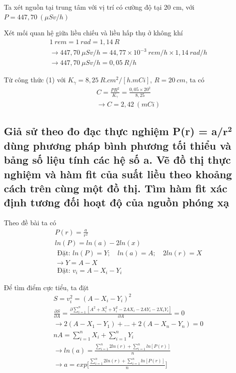 \documentclass{article}
\begin{document}
Ta xét nguồn tại trung tâm với vị trí có cường độ tại 20 cm, với \\
$P = 447,70 \ (\mu Sv/h)$

Xét mối quan hệ giữa liều chiếu và liều hấp thụ ở không khí
\begin{align*}
	& 1 \ rem = 1 \ rad = 1,14 \ R \\
	& \rightarrow 447,70 \ \mu Sv/h = 44,77 \times 10^{-3} \ rem/h \times 1,14 \ rad/h \\
	& \rightarrow 447,70 \ \mu Sv/h = 0,05 \ R/h
\end{align*}

Từ công thức (1) với $K_\gamma = 8,25 \ R.cm^2/[h.mCi]$, $R = 20 \ cm$, ta có
\begin{align*}
	& C = \frac{PR^2}{K_\gamma} = \frac{0,05\times 20^2}{8,25} \\
	& \rightarrow C = 2,42 \ (mCi)
\end{align*}

\subsection{Giả sử theo đo đạc thực nghiệm P(r) = a/$\mathbf{r^2}$ dùng phương pháp bình phương tối thiểu và bảng số liệu tính các hệ số a. Vẽ đồ thị thực nghiệm và hàm fit của suất liều theo khoảng cách trên cùng một đồ thị. Tìm hàm fit xác định tương đối hoạt độ của nguồn phóng xạ}

Theo đề bài ta có
\begin{align*}
	& P(r) = \frac{a}{r^2} \\
	& ln(P) = ln(a) - 2ln(x) \\
	& \text{ Đặt: } ln(P) = Y; \quad ln(a) = A; \quad 2ln(r) = X \\
	& \rightarrow Y = A - X \\
	& \text{ Đặt: } v_i = A - X_i - Y_i 
\end{align*}

Để tìm điểm cực tiểu, ta đặt
\begin{align*}
	& S = v_i^2 = (A - X_i - Y_i)^2 \\
	& \frac{\partial S}{\partial A} =  \frac{\partial \sum_{i=1}^{n}[A^2 + X_i^2 + Y_i^2 - 2AX_i - 2AY_i - 2X_iY_i]}{\partial A} = 0 \\
	& \rightarrow 2(A - X_1 - Y_1) + ... + 2(A - X_n - Y_n) = 0 \\
	& nA = \sum_{i=1}^{n}X_i +  \sum_{i=1}^{n}Y_i \\
	& \rightarrow ln(a) = \frac{\sum_{i = 1}^{n}2ln(r) + \sum_{i = 1}^{n}ln[P(r)]}{n} \\
	& \rightarrow a = exp\Bigg[\frac{\sum_{i = 1}^{n}2ln(r) + \sum_{i = 1}^{n}ln[P(r)]}{n}\Bigg]
\end{align*}
\end{document}
